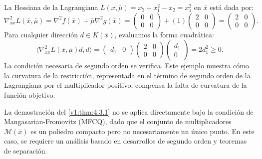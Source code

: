 \begin{example}
 La Hessiana de la Lagrangiana $L(x, \bar{\mu}) = x_2 + x_1^2 - x_2 = x_1^2$ en $\bar{x}$ está dada por:
 \[
 \nabla_{xx}^2 L(\bar{x}, \bar{\mu}) = \nabla^2 f(\bar{x}) + \bar{\mu} \nabla^2 g(\bar{x}) = \begin{pmatrix} 0 & 0 \\ 0 & 0 \end{pmatrix} + (1) \begin{pmatrix} 2 & 0 \\ 0 & 0 \end{pmatrix} = \begin{pmatrix} 2 & 0 \\ 0 & 0 \end{pmatrix}.
 \]
 Para cualquier dirección $d \in K(\bar{x})$, evaluamos la forma cuadrática:
 \[
 \langle \nabla_{xx}^2 L(\bar{x}, \bar{\mu})d, d \rangle = \begin{pmatrix} d_1 & 0 \end{pmatrix} \begin{pmatrix} 2 & 0 \\ 0 & 0 \end{pmatrix} \begin{pmatrix} d_1 \\ 0 \end{pmatrix} = 2d_1^2 \ge 0.
 \]
 La condición necesaria de segundo orden se verifica. Este ejemplo muestra cómo la curvatura de la restricción, representada en el término de segundo orden de la Lagrangiana por el multiplicador positivo, compensa la falta de curvatura de la función objetivo.
\end{example}

\begin{remark}
 La demostración del \cref{v1:thm:4.3.1} no se aplica directamente bajo la condición de Mangasarian-Fromovitz (MFCQ), dado que el conjunto de multiplicadores $\mathcal{M}(\bar{x})$ es un poliedro compacto pero no necesariamente un único punto. En este caso, se requiere un análisis basado en desarrollos de segundo orden y teoremas de separación.
\end{remark}

